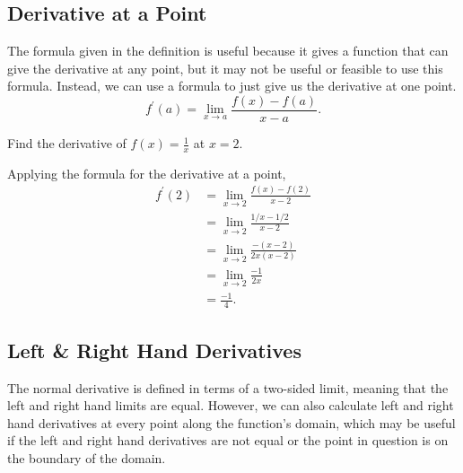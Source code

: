 \subsection{Derivative at a Point}
The formula given in the definition is useful because it gives a function that can give the derivative at any point, but it may not be useful or feasible to use this formula.
Instead, we can use a formula to just give us the derivative at one point.
\begin{equation}
	f^\prime(a) = \lim_{x \to a}{\frac{f(x)-f(a)}{x-a}}.
\end{equation}

\begin{example}
	Find the derivative of $f(x) = \frac{1}{x}$ at $x=2$.
\end{example}
\begin{answer}
	Applying the formula for the derivative at a point,
	\begin{align*}
		f^\prime(2) &= \lim_{x \to 2}{\frac{f(x)-f(2)}{x-2}} \\
		&= \lim_{x \to 2}{\frac{1/x - 1/2}{x-2}} \\
		& = \lim_{x \to 2}{\frac{-(x-2)}{2x(x-2)}} \\
		&= \lim_{x \to 2}{\frac{-1}{2x}} \\
		&= \frac{-1}{4}.
	\end{align*}
\end{answer}

\subsection{Left \& Right Hand Derivatives}
The normal derivative is defined in terms of a two-sided limit, meaning that the left and right hand limits are equal.
However, we can also calculate left and right hand derivatives at every point along the function's domain, which may be useful if the left and right hand derivatives are not equal or the point in question is on the boundary of the domain.


